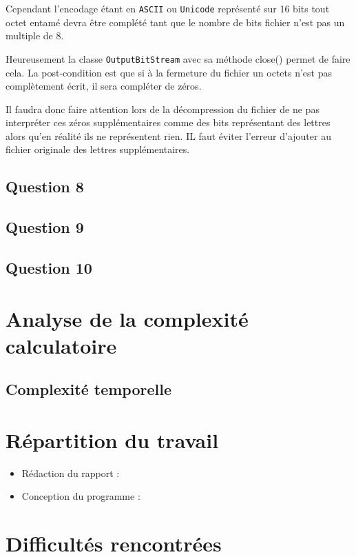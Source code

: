 \documentclass[11pt]{article}
\begin{document}
Cependant l'encodage étant en \verb+ASCII+ ou \verb+Unicode+ représenté sur 16 bits tout octet entamé devra être complété tant que le nombre de bits fichier n'est pas un multiple de 8.

Heureusement la classe \verb+OutputBitStream+ avec sa méthode close() permet de faire cela. La post-condition est que si à la fermeture du fichier un octets n'est pas complètement écrit, il sera compléter de zéros.

Il faudra donc faire attention lors de la décompression du fichier de ne pas interpréter ces zéros supplémentaires comme des bits représentant des lettres alors qu'en réalité ils ne représentent rien. IL faut éviter l'erreur d'ajouter au fichier originale des lettres supplémentaires.

\subsection*{Question 8}

\subsection*{Question 9}

\subsection*{Question 10}


\section{Analyse de la complexité calculatoire}
\subsection{Complexité temporelle}

\section{Répartition du travail}

\begin{itemize}
\item Rédaction du rapport : 
\item Conception du programme : 
\end{itemize}

\section{Difficultés rencontrées}
\end{document}
